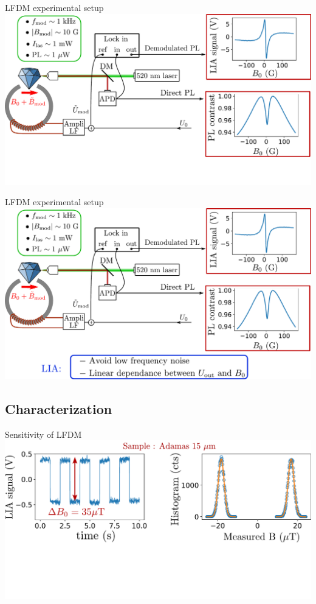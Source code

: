 \documentclass{beamer}
\begin{document}
\begin{frame}{LFDM experimental setup}
\centering
\includegraphics[width=\textwidth,height=0.85\textheight,keepaspectratio]{Slide_principle_LFDM_f-1}
\end{frame}

\begin{frame}{LFDM experimental setup}
\centering
\includegraphics[width=\textwidth,height=0.85\textheight,keepaspectratio]{Slide_principle_LFDM_f}
\end{frame}

\subsection{Characterization}
\begin{frame}{Sensitivity of LFDM}
\centering
\includegraphics[width=\textwidth,height=0.85\textheight,keepaspectratio]{Slide_sensi_LFDM-1}
\end{frame}
\end{document}
